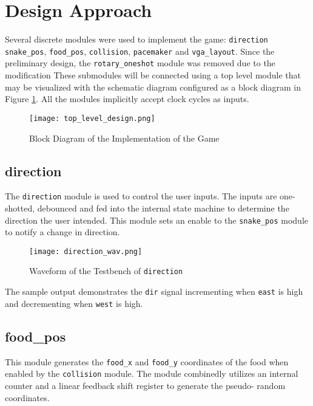 \documentclass[paper=usletter, fontsize=12pt]{article}
\begin{document}
    \section{Design Approach} Several discrete modules were used to implement
    the game: \texttt{direction} \texttt{snake\_pos}, \texttt{food\_pos},
    \texttt{collision}, \texttt{pacemaker} and \texttt{vga\_layout}. Since the
    preliminary design, the \texttt{rotary\_oneshot} module was removed due to
    the modification  These submodules will be connected using a top level
    module that may be visualized with the schematic diagram configured as a
    block diagram in Figure \ref{fig:schematic}. All the modules implicitly
    accept clock cycles as inputs.

    \begin{figure}[ht]
        \begin{center}
            \texttt{[image: top\_level\_design.png]}
            \caption{Block Diagram of the Implementation of the Game}
            \label{fig:schematic}
        \end{center}
    \end{figure}
    \newpage

        \subsection{direction} The \texttt{direction} module is used to control
        the user inputs. The inputs are one-shotted, debounced and fed into the
        internal state machine to determine the direction the user intended.
        This module sets an enable to the \texttt{snake\_pos} module to notify
        a change in direction.

        \begin{figure}[ht]
            \begin{center}
                \texttt{[image: direction\_wav.png]}
                \caption{Waveform of the Testbench of \texttt{direction}}
                \label{fig:direction_wav}
            \end{center}
        \end{figure}

        The sample output demonstrates the \texttt{dir} signal incrementing
        when \texttt{east} is high and decrementing when \texttt{west} is high.

        \subsection{food\_pos} This module generates the \texttt{food\_x} and
        \texttt{food\_y} coordinates of the food when enabled by the
        \texttt{collision} module. The module combinedly utilizes an internal
        counter and a linear feedback shift register to generate the pseudo-
        random coordinates.
\end{document}
